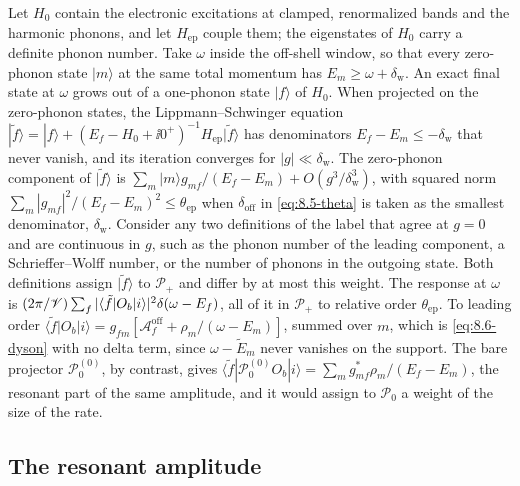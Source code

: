 Let $H_0$ contain the electronic excitations at clamped, renormalized bands and the harmonic phonons, and let $H_{\mathrm{ep}}$ couple them; the eigenstates of $H_0$ carry a definite phonon number. Take $\omega$ inside the off-shell window, so that every zero-phonon state $|m\rangle$ at the same total momentum has $E_m \ge \omega + \delta_{\mathrm{w}}$. An exact final state at $\omega$ grows out of a one-phonon state $|f\rangle$ of $H_0$. When projected on the zero-phonon states, the Lippmann--Schwinger equation $|\tilde f\rangle = |f\rangle + (E_f - H_0 + \ii0^+)^{-1}H_{\mathrm{ep}}|\tilde f\rangle$ has denominators $E_f - E_m \le -\delta_{\mathrm{w}}$ that never vanish, and its iteration converges for $|g| \ll \delta_{\mathrm{w}}$. The zero-phonon component of $|\tilde f\rangle$ is $\sum_m|m\rangle g_{mf}/(E_f - E_m) + O(g^3/\delta_{\mathrm{w}}^3)$, with squared norm $\sum_m|g_{mf}|^2/(E_f - E_m)^2 \le \theta_{\mathrm{ep}}$ when $\delta_{\mathrm{off}}$ in \cref{eq:8.5-theta} is taken as the smallest denominator, $\delta_{\mathrm{w}}$. Consider any two definitions of the label that agree at $g = 0$ and are continuous in $g$, such as the phonon number of the leading component, a Schrieffer--Wolff number, or the number of phonons in the outgoing state. Both definitions assign $|\tilde f\rangle$ to $\mathcal{P}_+$ and differ by at most this weight. The response at $\omega$ is $(2\pi/\mathscr{V})\sum_f|\langle\tilde f|O_b|i\rangle|^2\delta(\omega - E_f)$, all of it in $\mathcal{P}_+$ to relative order $\theta_{\mathrm{ep}}$. To leading order $\langle\tilde f|O_b|i\rangle = g_{fm}[\mathcal{A}^{\mathrm{off}}_f + \rho_m/(\omega - E_m)]$, summed over $m$, which is \cref{eq:8.6-dyson} with no delta term, since $\omega - \tilde E_m$ never vanishes on the support. The bare projector $\mathcal{P}^{(0)}_0$, by contrast, gives $\langle\tilde f|\mathcal{P}^{(0)}_0O_b|i\rangle = \sum_mg^*_{mf}\rho_m/(E_f - E_m)$, the resonant part of the same amplitude, and it would assign to $\mathcal{P}_0$ a weight of the size of the rate.

\subsection{The resonant amplitude}

